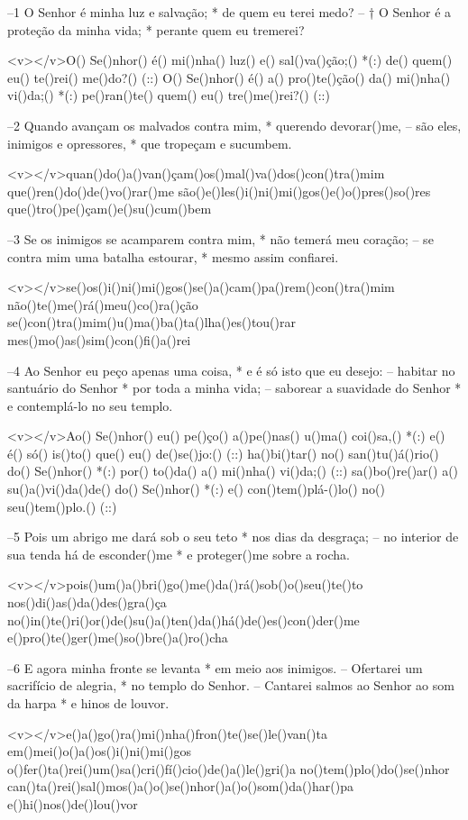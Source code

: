 –1 O Senhor é minha luz e salvação; *
de quem eu terei medo?
– † O Senhor é a proteção da minha vida; *
perante quem eu tremerei?

<v></v>O() Se()nhor() é() mi()nha() luz() e() sal()va()ção;() *(:)
de() quem() eu() te()rei() me()do?() (::)
O() Se()nhor() é() a() pro()te()ção() da() mi()nha() vi()da;() *(:)
pe()ran()te() quem() eu() tre()me()rei?() (::)

–2 Quando avançam os malvados contra mim, *
querendo devorar()me,
– são eles, inimigos e opressores, *
que tropeçam e sucumbem.

<v></v>quan()do()a()van()çam()os()mal()va()dos()con()tra()mim
que()ren()do()de()vo()rar()me
são()e()les()i()ni()mi()gos()e()o()pres()so()res
que()tro()pe()çam()e()su()cum()bem

–3 Se os inimigos se acamparem contra mim, *
não temerá meu coração;
– se contra mim uma batalha estourar, *
mesmo assim confiarei.

<v></v>se()os()i()ni()mi()gos()se()a()cam()pa()rem()con()tra()mim
não()te()me()rá()meu()co()ra()ção
se()con()tra()mim()u()ma()ba()ta()lha()es()tou()rar
mes()mo()as()sim()con()fi()a()rei

–4 Ao Senhor eu peço apenas uma coisa, *
e é só isto que eu desejo:
– habitar no santuário do Senhor *
por toda a minha vida;
– saborear a suavidade do Senhor *
e contemplá-lo no seu templo.

<v></v>Ao() Se()nhor() eu() pe()ço() a()pe()nas() u()ma() coi()sa,() *(:)
e() é() só() is()to() que() eu() de()se()jo:() (::)
ha()bi()tar() no() san()tu()á()rio() do() Se()nhor() *(:)
por() to()da() a() mi()nha() vi()da;() (::)
sa()bo()re()ar() a() su()a()vi()da()de() do() Se()nhor() *(:)
e() con()tem()plá-()lo() no() seu()tem()plo.() (::)

–5 Pois um abrigo me dará sob o seu teto *
nos dias da desgraça;
– no interior de sua tenda há de esconder()me *
e proteger()me sobre a rocha.

<v>\VSup{}</v>pois()um()a()bri()go()me()da()rá()sob()o()seu()te()to
nos()di()as()da()des()gra()ça
no()in()te()ri()or()de()su()a()ten()da()há()de()es()con()der()me
e()pro()te()ger()me()so()bre()a()ro()cha

–6 E agora minha fronte se levanta *
em meio aos inimigos.
– Ofertarei um sacrifício de alegria, *
no templo do Senhor.
– Cantarei salmos ao Senhor ao som da harpa *
e hinos de louvor.

<v>\VSup{}</v>e()a()go()ra()mi()nha()fron()te()se()le()van()ta
em()mei()o()a()os()i()ni()mi()gos
o()fer()ta()rei()um()sa()cri()fí()cio()de()a()le()gri()a
no()tem()plo()do()se()nhor
can()ta()rei()sal()mos()a()o()se()nhor()a()o()som()da()har()pa
e()hi()nos()de()lou()vor

